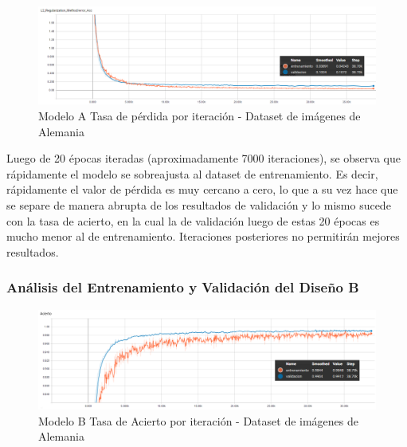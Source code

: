 			\begin{figure}[H]
				\begin{center}
				\includegraphics[width=1\textwidth]{images/desarrollo/trainResults/german/model0Loss_1} 
				\end{center}
				\begin{center}
				\caption{\small{Modelo A Tasa de pérdida por iteración - Dataset de imágenes de Alemania}}
				
				{\small{\fontsize{10}{16.8}\selectfont {Fuente: Elaboración propia}}}
				\end{center}
				\vspace{-1.5em}
			\end{figure}

			Luego de 20 épocas iteradas (aproximadamente  7000 iteraciones), se observa que rápidamente el modelo se sobreajusta al dataset de entrenamiento. Es decir, rápidamente el valor de pérdida es muy cercano a cero, lo que a su vez hace que se separe de manera abrupta de los resultados de validación y lo mismo sucede con la tasa de acierto, en la cual la de validación luego de estas 20 épocas es mucho menor al de entrenamiento. Iteraciones posteriores no permitirán mejores resultados.


		\subsubsection{Análisis del Entrenamiento y Validación del Diseño B}  
		
			\begin{figure}[H]
				\begin{center}
				\includegraphics[width=1\textwidth]{images/desarrollo/trainResults/german/model1Acierto} 
				\end{center}
				\begin{center}
				\caption{\small{Modelo B Tasa de Acierto por iteración - Dataset de imágenes de Alemania  }}
				
				{\small{\fontsize{10}{16.8}\selectfont {Fuente: Elaboración propia}}}
				\end{center}
				\vspace{-1.5em}
			\end{figure}
		
